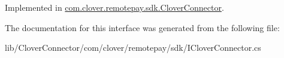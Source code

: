 Implemented in \hyperlink{classcom_1_1clover_1_1remotepay_1_1sdk_1_1_clover_connector_aa987ae8606b8b2f4a235e9c09ffeef3b}{com.\+clover.\+remotepay.\+sdk.\+Clover\+Connector}.



The documentation for this interface was generated from the following file\+:\begin{DoxyCompactItemize}
\item 
lib/\+Clover\+Connector/com/clover/remotepay/sdk/I\+Clover\+Connector.\+cs\end{DoxyCompactItemize}
